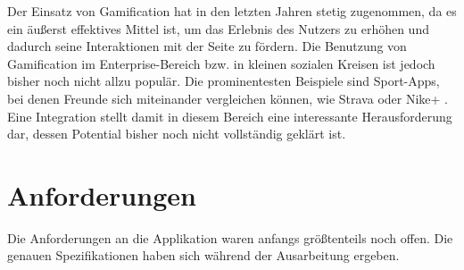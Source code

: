 \documentclass[12pt,twoside]{book}
\begin{document}
Der Einsatz von Gamification hat in den letzten Jahren stetig zugenommen, da es ein äußerst effektives Mittel ist, um das Erlebnis des Nutzers zu erhöhen und dadurch seine Interaktionen mit der Seite zu fördern.
Die Benutzung von Gamification im Enterprise-Bereich bzw. in kleinen sozialen Kreisen ist jedoch bisher noch nicht allzu populär. Die prominentesten Beispiele sind Sport-Apps, bei denen Freunde sich miteinander vergleichen können, wie Strava \cite{strava} oder Nike+ \cite{nike}. Eine Integration stellt damit in diesem Bereich eine interessante Herausforderung dar, dessen Potential bisher noch nicht vollständig geklärt ist.


\section{Anforderungen}

Die Anforderungen an die Applikation waren anfangs größtenteils noch offen. Die genauen Spezifikationen haben sich während der Ausarbeitung ergeben.
\end{document}
